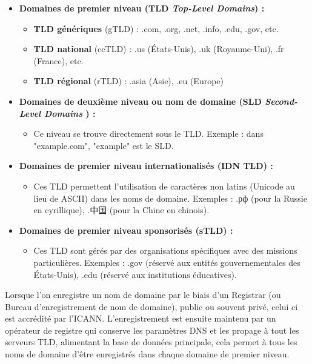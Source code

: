 \documentclass{cs-mpi}
\begin{document}
\begin{itemize}
    \item \textbf{Domaines de premier niveau (TLD \emph{Top-Level Domains}) :}
    \begin{itemize}
        \item \textbf{TLD génériques} (gTLD) : .com, .org, .net, .info, .edu, .gov, etc.
        \item \textbf{TLD national} (ccTLD) : .us (États-Unis), .uk (Royaume-Uni), .fr (France), etc.
        \item \textbf{TLD régional} (rTLD) : .asia (Asie), .eu (Europe)
    \end{itemize}
    \item \textbf{Domaines de deuxième niveau ou nom de domaine (SLD \emph{Second-Level Domains }) :}
    \begin{itemize}
        \item Ce niveau se trouve directement sous le TLD. Exemple : dans "example.com", "example" est le SLD.
    \end{itemize}
    \item \textbf{Domaines de premier niveau internationalisés (IDN TLD) :}
    \begin{itemize}
        \item Ces TLD permettent l'utilisation de caractères non latins (Unicode au lieu de ASCII) dans les noms de domaine. Exemples : .рф (pour la Russie en cyrillique), .中国 (pour la Chine en chinois).
    \end{itemize}
    \item \textbf{Domaines de premier niveau sponsorisés (sTLD) :}
    \begin{itemize}
        \item Ces TLD sont gérés par des organisations spécifiques avec des missions particulières. Exemples : .gov (réservé aux entités gouvernementales des États-Unis), .edu (réservé aux institutions éducatives).
    \end{itemize}
\end{itemize}

Lorsque l'on enregistre un nom de domaine par le biais d'un Registrar (ou Bureau d'enregistrement de nom de domaine), public ou souvent privé, celui ci est accrédité par l'ICANN. L'enregistrement est ensuite maintenu par un opérateur de registre qui conserve les paramètres DNS et les propage à tout les serveurs TLD, alimentant la base de données principale, cela permet à tous les noms de domaine d'être enregistrés dans chaque domaine de premier niveau.
\end{document}
